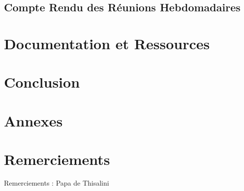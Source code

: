 \documentclass[a4paper,12pt]{report}  %
\begin{document}
	\subsection{Compte Rendu des Réunions Hebdomadaires}

	
	
	\section{Documentation et Ressources}
	
	\section{Conclusion}
	
	\section{Annexes}
	
	\section{Remerciements}
	Remerciements : 
	Papa de Thisalini 🙏
	
	
	
%	
%	
%	
	
\end{document}
